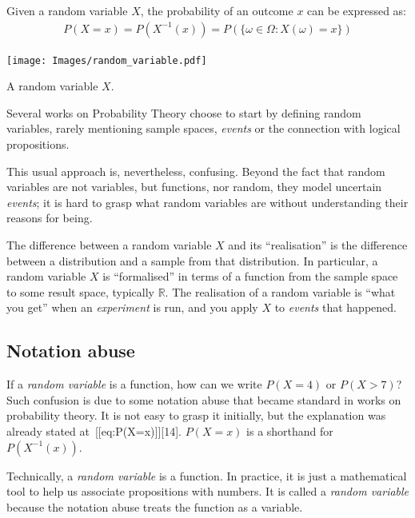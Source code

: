 \documentclass[
  letterpaper,
  12pt,
  british]{tufte-book}
\theoremstyle{plain}
\theoremstyle{definition}
\theoremstyle{plain}
\theoremstyle{remark}
\begin{document}
Given a random variable \(\mathit{X}\), the probability of an outcome
\(\mathit{x}\) can be expressed as: \begin{align}
    P(\mathit{X}=\mathit{x}) = P(\mathit{X}^{-1}(\mathit{x})) = P(\{\omega \in \Omega: \mathit{X}(\omega)=\mathit{x}\})\label{eq:P(X=x)} 
\end{align}

\begin{marginfigure}

{\centering \texttt{[image: Images/random\_variable.pdf]}

}

\caption{\label{fig-random_variable}A random variable \(X\).}

\end{marginfigure}

Several works on Probability Theory choose to start by defining random
variables, rarely mentioning sample spaces, \emph{events} or the
connection with logical propositions.

This usual approach is, nevertheless, confusing. Beyond the fact that
random variables are not variables, but functions, nor random, they
model uncertain \emph{events}; it is hard to grasp what random variables
are without understanding their reasons for being.

The difference between a random variable \(\mathit{X}\) and its
``realisation'' is the difference between a distribution and a sample
from that distribution. In particular, a random variable \(\mathit{X}\)
is ``formalised'' in terms of a function from the sample space to some
result space, typically \(\mathbb{R}\). The realisation of a random
variable is ``what you get'' when an \emph{experiment} is run, and you
apply \(\mathit{X}\) to \emph{events} that happened.

\hypertarget{notation-abuse}{%
\subsection{Notation abuse}\label{notation-abuse}}

If a \emph{random variable} is a function, how can we write
\(P(\mathit{X}=4)\) or \(P(\mathit{X}> 7)\)? Such confusion is due to
some notation abuse that became standard in works on probability theory.
It is not easy to grasp it initially, but the explanation was already
stated at~{[}{[}eq:P(X=x){]}{]}{[}14{]}. \(P(\mathit{X}=\mathit{x})\) is
a shorthand for \(P(\mathit{X}^{-1}(\mathit{x}))\).

Technically, a \emph{random variable} is a function. In practice, it is
just a mathematical tool to help us associate propositions with numbers.
It is called a \emph{random variable} because the notation abuse treats
the function as a variable.
\end{document}
